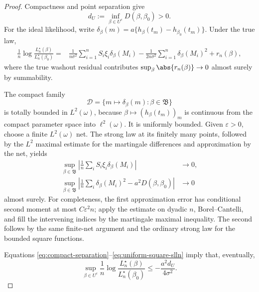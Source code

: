 \begin{proof}
Compactness and point separation give
\begin{equation}
 d_U:=\inf_{\beta\in U^c}D(\beta,\beta_0)>0.
 \label{eq:compact-separation}
\end{equation}
For the ideal likelihood, write
\(\delta_\beta(m)=a\{h_\beta(t_m)-h_{\beta_0}(t_m)\}\).  Under the true law,
\begin{align}
 \frac1n\log\frac{L_n^\star(\beta)}{L_n^\star(\beta_0)}
 ={}&\frac1{n\sigma^2}\sum_{i=1}^n
 S_i\xi_i\delta_\beta(M_i)
 -\frac1{2n\sigma^2}\sum_{i=1}^n\delta_\beta(M_i)^2
 +r_{n}(\beta),
 \label{eq:ideal-log-ratio}
\end{align}
where the true washout residual contributes
\(\sup_\beta\abs{r_n(\beta)}\to0\) almost surely by summability.

The compact family
\[
 \mathcal D=\{m\mapsto\delta_\beta(m):\beta\in\mathfrak B\}
\]
is totally bounded in \(L^2(\omega)\), because
\(\beta\mapsto(h_\beta(t_m))_m\) is continuous from the compact parameter
space into \(\ell^2(\omega)\).  It is uniformly bounded.  Given
\(\varepsilon>0\), choose a finite \(L^2(\omega)\) net.  The strong law at
its finitely many points, followed by the \(L^2\) maximal estimate for the
martingale differences and approximation by the net, yields
\begin{align}
 \sup_{\beta\in\mathfrak B}
 \left|\frac1n\sum_iS_i\xi_i\delta_\beta(M_i)\right|&\longrightarrow0,
 \label{eq:uniform-score-slln}\\
 \sup_{\beta\in\mathfrak B}
 \left|\frac1n\sum_i\delta_\beta(M_i)^2
      -a^2D(\beta,\beta_0)\right|&\longrightarrow0
 \label{eq:uniform-square-slln}
\end{align}
almost surely.  For completeness, the first approximation error has
conditional second moment at most \(C\varepsilon^2n\); apply the estimate on
dyadic \(n\), Borel--Cantelli, and fill the intervening indices by the
martingale maximal inequality.  The second follows by the same finite-net
argument and the ordinary strong law for the bounded square functions.

Equations \eqref{eq:compact-separation}--\eqref{eq:uniform-square-slln} imply
that, eventually,
\begin{equation}
 \sup_{\beta\in U^c}
 \frac1n\log\frac{L_n^\star(\beta)}{L_n^\star(\beta_0)}
 \le-\frac{a^2d_U}{4\sigma^2}.
 \label{eq:numerator-exponential}
\end{equation}


\end{proof}
